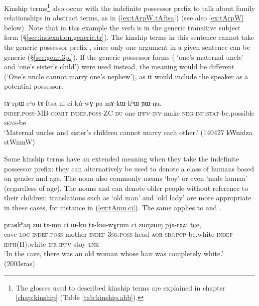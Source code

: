 Kinship terms\footnote{The glosses used to described kinship terms are explained in chapter \ref{chap:kinship} (Table \ref{tab:kinship.abb}). } also occur with the indefinite possessor prefix to talk about family relationships in abstract terms, as in (\ref{ex:tArpW.tAftsa}) (see also \ref{ex:tArpW} below). Note that in this example the verb is in the generic transitive subject form (§\ref{sec:indexation.generic.tr}). The kinship terms in this sentence cannot take the generic possessor prefix , since only one argument in a given sentence can be generic (§\ref{sec:genr.3pl}). If the generic possessor forms ( `one's maternal uncle' and  `one's sister's child') were used instead, the meaning would be different (`One's uncle cannot marry one's nephew'), as it would include the speaker as a potential possessor.

\begin{exe}
\ex \label{ex:tArpW.tAftsa}
\gll tɤ-rpɯ cʰo tɤ-ftsa ni ci kú-wɣ-pa mɤ-kɯ-kʰɯ ɲɯ-ŋu. \\
\textsc{indef}.\textsc{poss}-MB \textsc{comit} \textsc{indef}.\textsc{poss}-ZC \textsc{du} one \textsc{ipfv}-\textsc{inv}-make \textsc{neg}-\textsc{inf}:\textsc{stat}-be.possible \textsc{sens}-be \\
\glt `Maternal uncles and sister's children cannot marry each other.' (140427 kWmdza stWnmW) 
\end{exe}

Some kinship terms have an extended meaning when they take the indefinite possessor prefix: they can alternatively be used to denote a class of humans based on gender and age. The noun  also commonly means `boy' or even `male human' (regardless of age). The nouns  and  can denote older people without reference to their children; translations such as `old man' and `old lady' are more appropriate in these cases, for instance in (\ref{ex:tAmu.ci}). The same applies to  and .


\begin{exe}
\ex \label{ex:tAmu.ci}
\gll praʁkʰaŋ zɯ tɤ-mu ci ɯ-ku tɤ-kɯ-wɣrum ci zɯŋzɯŋ pjɤ-rɤʑi tɕe, \\
cave \textsc{loc} \textsc{indef}.\textsc{poss}-mother \textsc{indef} \textsc{3sg}.\textsc{poss}-head \textsc{aor}-\textsc{sbj}:\textsc{pcp}-be.white \textsc{indef} \textsc{idph}(II):white \textsc{ifr}.\textsc{ipfv}-stay \textsc{lnk} \\
\glt `In the cave, there was an old woman whose hair was completely white.' (2003sras)
\end{exe}

